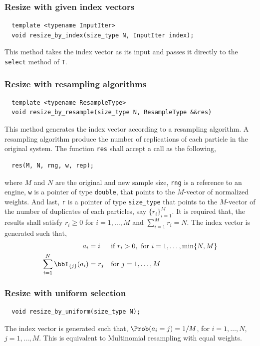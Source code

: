 \subsubsection{Resize with given index vectors}

\begin{Verbatim}
  template <typename InputIter>
  void resize_by_index(size_type N, InputIter index);
\end{Verbatim}
This method takes the index vector as its input and passes it directly to the
\verb|select| method of \verb|T|.

\subsubsection{Resize with resampling algorithms}

\begin{Verbatim}
  template <typename ResampleType>
  void resize_by_resample(size_type N, ResampleType &&res)
\end{Verbatim}
This method generates the index vector according to a resampling algorithm. A
resampling algorithm produce the number of replications of each particle in the
original system. The function \verb|res| shall accept a call as the following,
\begin{Verbatim}
  res(M, N, rng, w, rep);
\end{Verbatim}
where $M$ and $N$ are the original and new sample size, \verb|rng| is a
reference to an \rng engine, \verb|w| is a pointer of type \verb|double|, that
points to the $M$-vector of normalized weights. And last, \verb|r| is a pointer
of type \verb|size_type| that points to the $M$-vector of the number of
duplicates of each particles, say $\{r_i\}_{i=1}^M$. It is required that, the
results shall satisfy $r_i\ge0$ for $i=1,\dots,M$ and $\sum_{i=1}^M r_i = N$.
The index vector is generated such that,
\begin{align*}
  a_i &= i &&\text{if } r_i > 0, \text{ for } i = 1,\dots,\min\{N, M\} \\
  \sum_{i=1}^N\bbI_{\{j\}}(a_i) &= r_j &&\text{for } j = 1,\dots,M
\end{align*}

\subsubsection{Resize with uniform selection}

\begin{Verbatim}
  void resize_by_uniform(size_type N);
\end{Verbatim}
The index vector is generated such that, $\Prob(a_i = j) = 1/M$, for $i =
1,\dots,N$, $j = 1,\dots,M$. This is equivalent to Multinomial resampling with
equal weights.

